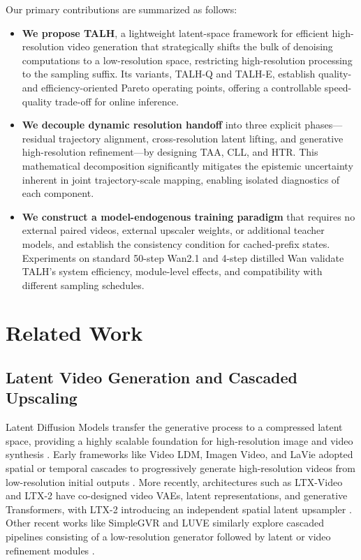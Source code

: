 Our primary contributions are summarized as follows:

\begin{itemize}
\item
  \textbf{We propose TALH}, a lightweight latent-space framework for
  efficient high-resolution video generation that strategically shifts
  the bulk of denoising computations to a low-resolution space,
  restricting high-resolution processing to the sampling suffix. Its
  variants, TALH-Q and TALH-E, establish quality- and
  efficiency-oriented Pareto operating points, offering a controllable
  speed-quality trade-off for online inference.
\item
  \textbf{We decouple dynamic resolution handoff} into three explicit
  phases---residual trajectory alignment, cross-resolution latent
  lifting, and generative high-resolution refinement---by designing TAA,
  CLL, and HTR. This mathematical decomposition significantly mitigates
  the epistemic uncertainty inherent in joint trajectory-scale mapping,
  enabling isolated diagnostics of each component.
\item
  \textbf{We construct a model-endogenous training paradigm} that
  requires no external paired videos, external upscaler weights, or
  additional teacher models, and establish the consistency condition for
  cached-prefix states. Experiments on standard 50-step Wan2.1 and
  4-step distilled Wan validate TALH's system efficiency, module-level
  effects, and compatibility with different sampling schedules.
\end{itemize}

\section{Related Work}

\subsection{Latent Video Generation and Cascaded Upscaling}

Latent Diffusion Models transfer the generative process to a compressed
latent space, providing a highly scalable foundation for high-resolution
image and video synthesis \citep{rombach2022ldm}. Early frameworks like
Video LDM, Imagen Video, and LaVie adopted spatial or temporal cascades
to progressively generate high-resolution videos from low-resolution
initial outputs
\citep{blattmann2023videoldm, ho2022imagenvideo, wang2023lavie}. More
recently, architectures such as LTX-Video and LTX-2 have co-designed
video VAEs, latent representations, and generative Transformers, with
LTX-2 introducing an independent spatial latent upsampler
\citep{hacohen2024ltxvideo, hacohen2026ltx2}. Other recent works like
SimpleGVR and LUVE similarly explore cascaded pipelines consisting of a
low-resolution generator followed by latent or video refinement modules
\citep{xie2025simplegvr, zhao2026luve}.

